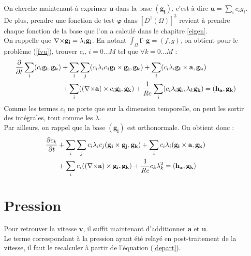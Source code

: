 \label{discr}

On cherche maintenant à exprimer $\mathbf{u}$ dans la base $(\mathbf{g_i})$, c'est-à-dire $\mathbf{u}=\sum_i c_ig_i$.\\
De plus, prendre une fonction de test $\bm{\varphi}$ dans $[D^1(\Omega)]^3$ revient à prendre chaque fonction de la base que l'on a calculé dans le chapitre \ref{eigen}.\\
On rappelle que ${\nabla\times} \mathbf{g_i}=\lambda_i\mathbf{g_i}$. En notant $\int_\Omega \mathbf{f}\cdot\mathbf{g}=(f,g)$, on obtient pour le problème (\ref{fvu}), trouver $c_i$, $i=0\dots M$ tel que $\forall k=0\dots M$ :
\begin{align*}
\frac{\partial}{\partial t}\sum_i (c_i\mathbf{g_i}, \mathbf{g_k}) &+ \sum_i\sum_j (c_i\lambda_ic_j\mathbf{g_i}\times \mathbf{g_j},\mathbf{g_k}) + \sum_i(c_i\lambda_i\mathbf{g_i}\times \mathbf{a},\mathbf{g_k})\\
&+ \sum_i (({\nabla\times} \mathbf{a})\times c_i\mathbf{g_i},\mathbf{g_k}) + \frac{1}{Re}\sum_i(c_i\lambda_i\mathbf{g_i}, \lambda_k\mathbf{g_k}) = (\mathbf{h_a},\mathbf{g_k})
\end{align*}
Comme les termes $c_i$ ne porte que sur la dimension temporelle, on peut les
sortir des intégrales, tout comme les $\lambda$.\\

Par ailleurs, on rappel que la base $(\mathbf{g_i})$ est orthonormale. On obtient donc :
\begin{equation}\label{fvspec}
\begin{aligned}
\frac{\partial c_k}{\partial t} &+ \sum_i\sum_j c_i\lambda_i c_j(\mathbf{g_i}\times \mathbf{g_j}, \mathbf{g_k}) + \sum_i c_i\lambda_i(\mathbf{g_i}\times \mathbf{a},\mathbf{g_k})\\
&+ \sum_i c_i(({\nabla\times} \mathbf{a})\times \mathbf{g_i}, \mathbf{g_k}) + \frac{1}{Re}c_k\lambda_k^2 = (\mathbf{h_a},\mathbf{g_k})
\end{aligned}
\end{equation}

\section{Pression}
\label{pression}
Pour retrouver la vitesse $\mathbf{v}$, il suffit maintenant d'additionner $\mathbf{a}$ et $\mathbf{u}$.\\
Le terme correspondant à la pression ayant été relayé en post-traitement de la vitesse, il faut le recalculer à partir de l'équation (\ref{depart}).

